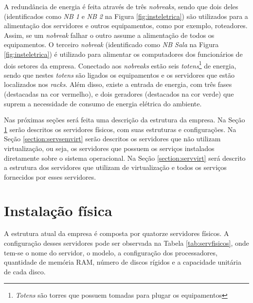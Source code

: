 A redundância de energia é feita através de três \textit{nobreaks}, sendo que dois deles (identificados como \textit{NB 1} e \textit{NB 2} na 
Figura \ref{fig:insteletrica}) são utilizados para a alimentação dos servidores e outros equipamentos, como por exemplo, roteadores. Assim, se um 
\textit{nobreak} falhar o outro assume a alimentação de todos os equipamentos. O terceiro \textit{nobreak} (identificado como \textit{NB Sala} 
na Figura \ref{fig:insteletrica}) é utilizado para alimentar os computadores dos funcionários de dois setores da empresa. Conectado aos 
\textit{nobreaks} estão seis \textit{totens}\footnote[1]{\textit{Totens} são torres que possuem tomadas para plugar os equipamentos} de energia, 
sendo que nestes \textit{totens} são ligados os equipamentos e os servidores que estão localizados nos \textit{racks}. Além disso, existe a 
entrada de energia, com três fases (destacadas na cor vermelho), e dois geradores (destacados na cor verde) que suprem a necessidade de consumo 
de energia elétrica do ambiente.

Nas próximas seções será feita uma descrição da estrutura da empresa. Na Seção \ref{section:fisico} serão descritos os servidores físicos, com 
suas estruturas e configurações. Na Seção \ref{section:servsemvirt} serão descritos os servidores que não utilizam virtualização, ou seja, 
os servidores que possuem os serviços instalados diretamente sobre o sistema operacional. Na Seção \ref{section:servvirt} será descrito a 
estrutura dos servidores que utilizam de virtualização e todos os serviços fornecidos por esses servidores.

\section{Instalação física}
\label{section:fisico}

A estrutura atual da empresa é composta por quatorze servidores físicos. A configuração desses servidores pode ser observada na 
Tabela \ref{tab:servfisicos}, onde tem-se o nome do servidor, o modelo, a configuração dos processadores, quantidade de memória
\ac{RAM}, número de discos rígidos e a capacidade unitária de cada disco.


